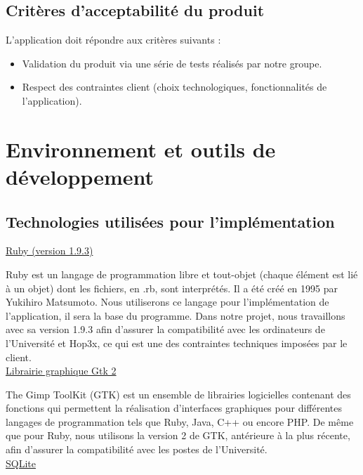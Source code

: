 \documentclass[a4paper, 12pt, twoside]{article}
\begin{document}
\subsection{Critères d'acceptabilité du produit}

L’application doit répondre aux critères suivants :
\smallbreak
\begin{itemize}\setlength{\itemsep}{1mm}
 \item Validation du produit via une série de tests réalisés par notre groupe. 
 \item Respect des contraintes client (choix technologiques, fonctionnalités de l'application).
\end{itemize}


\section{Environnement et outils de développement}

\subsection{Technologies utilisées pour l'implémentation}

\ul{Ruby (version 1.9.3)}\newline

Ruby est un langage de programmation libre et tout-objet (chaque élément est lié à un objet) dont les fichiers, en .rb,  sont interprétés. Il a été créé en 1995 par Yukihiro Matsumoto. Nous utiliserons ce langage pour l’implémentation de l’application, il sera la base du programme. Dans notre projet, nous travaillons avec sa version 1.9.3 afin d’assurer la compatibilité avec les ordinateurs de l’Université et Hop3x, ce qui est une des contraintes techniques imposées par le client.\\

\ul{Librairie graphique Gtk 2}\newline

The Gimp ToolKit (GTK) est un ensemble de librairies logicielles contenant des fonctions qui permettent la réalisation d’interfaces graphiques pour différentes langages de programmation tels que Ruby, Java, C++ ou encore PHP. De même que pour Ruby, nous utilisons la version 2 de GTK, antérieure à la plus récente, afin d’assurer la compatibilité avec les postes de l’Université.\\

\ul{SQLite}\newline
\end{document}
